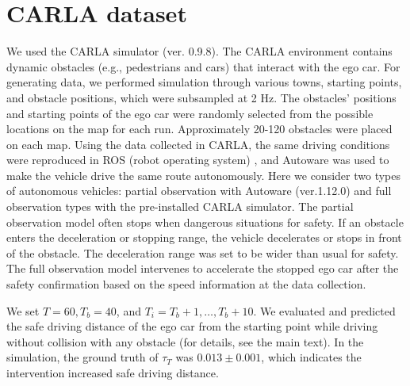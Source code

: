 \section{CARLA dataset}
\label{app:carla}
We used the CARLA simulator \cite{dosovitskiy2017carla} (ver. 0.9.8).
The CARLA environment contains dynamic obstacles (e.g., pedestrians and cars) that interact with the ego car. For generating data, we performed simulation through various towns, starting points, and obstacle positions, which were subsampled at 2 Hz.
The obstacles' positions and starting points of the ego car were randomly selected from the possible locations on the map for each run.
Approximately 20-120 obstacles were placed on each map.
Using the data collected in CARLA, the same driving conditions were reproduced in ROS (robot operating system) \cite{quigley2009ros}, and Autoware was used to make the vehicle drive the same route autonomously.
Here we consider two types of autonomous vehicles: partial observation with Autoware \cite{kato2015open} (ver.1.12.0) and full observation types with the pre-installed CARLA simulator. 
The partial observation model often stops when dangerous situations for safety. 
If an obstacle enters the deceleration or stopping range, the vehicle decelerates or stops in front of the obstacle.
The deceleration range was set to be wider than usual for safety.
The full observation model intervenes to accelerate the stopped ego car after the safety confirmation based on the speed information at the data collection.

We set $T=60, T_b=40$, and $T_i=T_b+1,\ldots,T_b+10$.
We evaluated and predicted the safe driving distance of the ego car from the starting point while driving without collision with any obstacle (for details, see the main text). 
In the simulation, the ground truth of $\tau_T$ was $0.013 \pm 0.001$, which indicates the intervention increased safe driving distance. 
